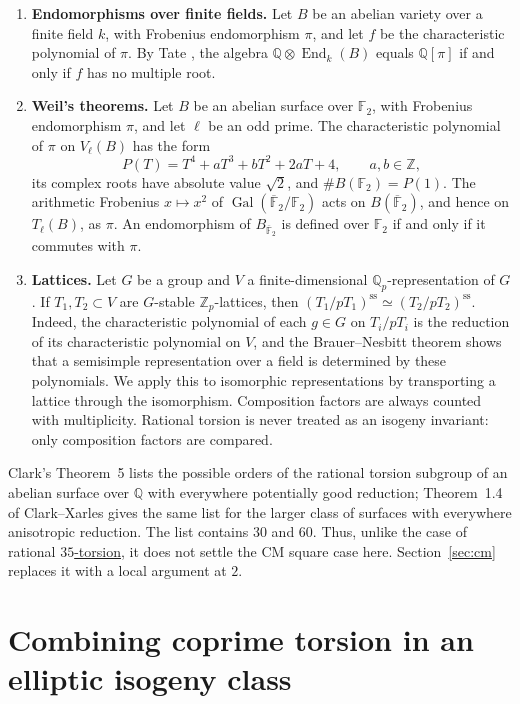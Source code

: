 \documentclass[11pt]{article}
\newcommand{\Q}{\mathbb Q}
\newcommand{\Z}{\mathbb Z}
\newcommand{\F}{\mathbb F}
\DeclareMathOperator{\End}{End}
\DeclareMathOperator{\Gal}{Gal}
\begin{document}
\begin{enumerate}
\item \textbf{Endomorphisms over finite fields.} Let \(B\) be an
abelian variety over a finite field \(k\), with Frobenius endomorphism
\(\pi\), and let \(f\) be the characteristic polynomial of \(\pi\). By
Tate \cite[Theorem 2(c)]{Tate}, the algebra \(\Q\otimes\End_k(B)\)
equals \(\Q[\pi]\) if and only if \(f\) has no multiple root.

\item \textbf{Weil's theorems.} Let \(B\) be an abelian surface over
\(\F_2\), with Frobenius endomorphism \(\pi\), and let \(\ell\) be an
odd prime. The characteristic polynomial of \(\pi\) on \(V_\ell(B)\)
has the form
\[
 P(T)=T^4+aT^3+bT^2+2aT+4,\qquad a,b\in\Z,
\]
its complex roots have absolute value \(\sqrt2\), and
\(\#B(\F_2)=P(1)\). The arithmetic Frobenius \(x\mapsto x^2\) of
\(\Gal(\overline{\F}_2/\F_2)\) acts on \(B(\overline{\F}_2)\), and
hence on \(T_\ell(B)\), as \(\pi\). An endomorphism of
\(B_{\overline{\F}_2}\) is defined over \(\F_2\) if and only if it
commutes with \(\pi\).

\item \textbf{Lattices.} Let \(G\) be a group and \(V\) a
finite-dimensional \(\Q_p\)-representation of \(G\). If
\(T_1,T_2\subset V\) are \(G\)-stable \(\Z_p\)-lattices, then
\((T_1/pT_1)^{\mathrm{ss}}\simeq(T_2/pT_2)^{\mathrm{ss}}\). Indeed,
the characteristic polynomial of each \(g\in G\) on \(T_i/pT_i\) is
the reduction of its characteristic polynomial on \(V\), and the
Brauer--Nesbitt theorem shows that a semisimple representation over a
field is determined by these polynomials. We apply this to isomorphic
representations by transporting a lattice through the isomorphism.
Composition factors are always counted with multiplicity. Rational
torsion is never treated as an isogeny invariant: only composition
factors are compared.
\end{enumerate}

Clark's Theorem~5 \cite{Clark} lists the possible orders of the
rational torsion subgroup of an abelian surface over \(\Q\) with
everywhere potentially good reduction; Theorem~1.4 of Clark--Xarles
\cite{CX} gives the same list for the larger class of surfaces with
everywhere anisotropic reduction. The list contains \(30\) and \(60\).
Thus, unlike the case of rational
\href{https://genus-2-torsion.github.io/proofs/qsimple-35-obstruction.html}{\(35\)-torsion}, it does not settle the CM
square case here. Section~\ref{sec:cm} replaces it with a local
argument at \(2\).

\section{Combining coprime torsion in an elliptic isogeny class}
\label{sec:combining}
\end{document}
